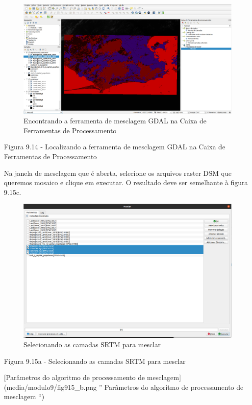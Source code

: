 \documentclass[
]{book}
\begin{document}
\begin{figure}
\centering
\includegraphics{media/modulo9/fig914.png}
\caption{Encontrando a ferramenta de mesclagem GDAL na Caixa de Ferramentas de Processamento}
\end{figure}

Figura 9.14 - Localizando a ferramenta de mesclagem GDAL na Caixa de Ferramentas de Processamento

Na janela de mesclagem que é aberta, selecione os arquivos raster DSM que queremos mosaico e clique em executar. O resultado deve ser semelhante à figura 9.15c.

\begin{figure}
\centering
\includegraphics{media/modulo9/fig915_a.png}
\caption{Selecionando as camadas SRTM para mesclar}
\end{figure}

Figura 9.15a - Selecionando as camadas SRTM para mesclar

{[}Parâmetros do algoritmo de processamento de mesclagem{]}(media/modulo9/fig915\_b.png '' Parâmetros do algoritmo de processamento de mesclagem ``)
\end{document}
